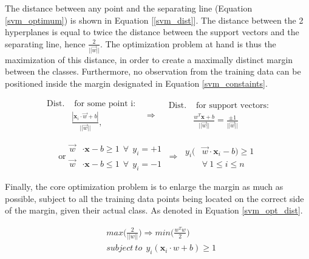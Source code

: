 	The distance between any point and the separating line (Equation \ref{svm_optimum}) is shown in Equation [\ref{svm_dist}]. The distance between the 2 hyperplanes is equal to twice the distance between the support vectors and the separating line, hence $ \frac{2}{||\vec{w}||} $. The optimization problem at hand is thus the maximization of this distance, in order to create a maximally distinct margin between the classes. Furthermore, no observation from the training data can be positioned inside the margin designated in Equation \ref{svm_constaints}.
	
	\begin{equation}
		\begin{aligned}
			\text{Dist.}&\text{ for some point i}: \\ 
			&\frac{| \textbf{x}_i \cdot \vec{w} + b|}{||\vec{w}||},
		\end{aligned}
		\ \ \ \Rightarrow 	\ \ \ \ 
		\begin{aligned}
			\text{Dist.}&\text{ for support vectors:} \\
			&\frac{w^T\textbf{x} + b}{||\vec{w}||} = \frac{\pm 1}{||\vec{w}||}
		\end{aligned}
		\label{svm_dist}
	\end{equation}
	
	\begin{equation}
		\text{or}
		\begin{aligned}
			\vec{w}& \cdot \textbf{x} - b \geq 1 \ \ \forall \ \  y_i = +1 \\
			\vec{w}& \cdot \textbf{x} - b \leq 1 \ \ \forall \ \  y_i = -1
			\end{aligned}	
			\ \Rightarrow \ 
			\begin{aligned}
			y_i(&\vec{w} \cdot \textbf{x}_i - b) \geq 1 \\
			&\forall \ 1 \leq i \leq n
		\end{aligned}
		\label{svm_constaints}
	\end{equation}
	
	Finally, the core optimization problem is to enlarge the margin as much as possible, subject to all the training data points being located on the correct side of the margin, given their actual class. As denoted in Equation \ref{svm_opt_dist}.
	
	\begin{equation}
		\begin{aligned}
			&max \Bigg(\frac{2}{||w||}\Bigg) \Rightarrow 
			min \Bigg( \frac{w^Tw}{2}	\Bigg)\\
			&subject \  to \ \ y_i(\textbf{x}_i \cdot w + b) \geq 1
		\end{aligned}
		\label{svm_opt_dist}
	\end{equation}
	
